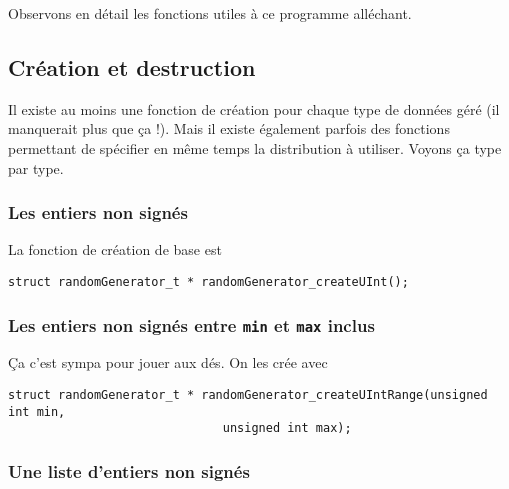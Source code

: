 \documentclass{article}
\begin{document}
   Observons en détail les fonctions utiles à ce programme alléchant.

%
\subsection{Création et destruction}

   Il existe au moins une fonction de création pour chaque type de
données géré (il manquerait plus que ça !). Mais il existe également
parfois des fonctions permettant de spécifier en même temps la
distribution à utiliser. Voyons ça type par type.

%
\subsubsection{Les entiers non signés}

   La fonction de création de base est 

\begin{verbatim}
struct randomGenerator_t * randomGenerator_createUInt();
\end{verbatim}

%
\subsubsection{Les entiers non signés entre {\tt min} et {\tt max} inclus}

   Ça c'est sympa pour jouer aux dés. On les crée avec 

\begin{verbatim}
struct randomGenerator_t * randomGenerator_createUIntRange(unsigned int min,
						      unsigned int max);
\end{verbatim}

%
\subsubsection{Une liste d'entiers non signés}
\end{document}

